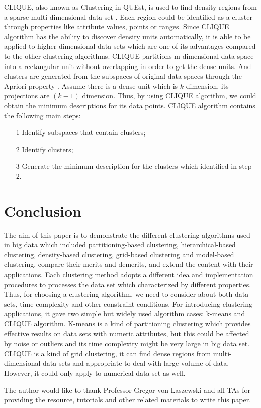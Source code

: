 \documentclass[sigconf]{acmart}
\begin{document}
CLIQUE, also known as Clustering in QUEst, is used to find density regions from a sparse multi-dimensional data set \cite{bdca}. Each region could be identified as a cluster through properties like attribute values, points or ranges. Since CLIQUE algorithm has the ability to discover density units automatically, it is able to be applied to higher dimensional data sets which are one of its advantages compared to the other clustering algorithms. CLIQUE partitions m-dimensional data space into a rectangular unit without overlapping in order to get the dense units. And clusters are generated from the subspaces of original data spaces through the Apriori property \cite{bdca}. Assume there is a dense unit which is $k$ dimension, its projections are $(k-1)$ dimension. Thus, by using CLIQUE algorithm, we could obtain the minimum descriptions for its data points. CLIQUE algorithm contains the following main steps:
\begin{itemize}
\item[1] Identify subspaces that contain clusters;
\item[2] Identify clusters;
\item[3] Generate the minimum description for the clusters which identified in step 2.
\end{itemize}

\section{Conclusion}

The aim of this paper is to demonstrate the different clustering algorithms used in big data which included partitioning-based clustering, hierarchical-based clustering, density-based clustering, grid-based clustering and model-based clustering, compare their merits and demerits, and extend the content with their applications. Each clustering method adopts a different idea and implementation procedures to processes the data set which characterized by different properties. Thus, for choosing a clustering algorithm, we need to consider about both data sets, time complexity and other constraint conditions. For introducing clustering applications, it gave two simple but widely used algorithm cases: k-means and CLIQUE algorithm. K-means is a kind of partitioning clustering which provides effective results on data sets with numeric attributes, but this could be affected by noise or outliers and its time complexity might be very large in big data set. CLIQUE is a kind of grid clustering, it can find dense regions from multi-dimensional data sets and appropriate to deal with large volume of data. However, it could only apply to numerical data set as well.

\begin{acks}

The author would like to thank Professor Gregor von Laszewski and all TAs for providing the resource, tutorials and other related materials to write this paper.

\end{acks}



\end{document}
